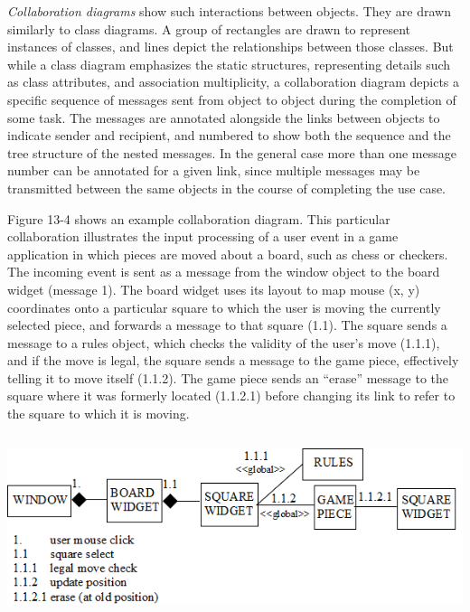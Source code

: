 \textit{Collaboration diagrams} show such
interactions between objects. They are drawn similarly to class diagrams. A
group of rectangles are drawn to represent instances of
classes, and lines depict the relationships between those classes. But while a
class diagram emphasizes the static structures, representing details such as
class attributes, and association multiplicity, a collaboration diagram depicts
a specific sequence of messages sent from object to object during the
completion of some task. The messages are annotated alongside the
links between objects to indicate sender and recipient, and numbered
to show both the sequence and the tree structure of the
nested messages. In the general case more than
one message number can be annotated for a given link, since multiple messages may be transmitted between the same
objects in the course of completing the use case.

Figure 13-4 shows an example collaboration diagram. This particular
collaboration illustrates the input processing of a user event in a game
application in which pieces are moved about a board, such as chess or
checkers. The incoming event is sent as a message from the window object to the
board widget (message 1). The board widget uses its layout to map mouse (x, y)
coordinates onto a particular square to which the user is moving the currently
selected piece, and forwards a message to that square (1.1). The square sends a
message to a rules object, which checks the validity of the user's move
(1.1.1), and if the move is legal, the square sends a message to the
game piece, effectively telling it to move itself (1.1.2). The game
piece sends an ``erase''
message to the square where it was formerly located (1.1.2.1) before changing
its link to refer to the square to which it is moving.

\bigskip

\includegraphics[width=5.5in,height=2.1in]{ub-img/collabor.png}

